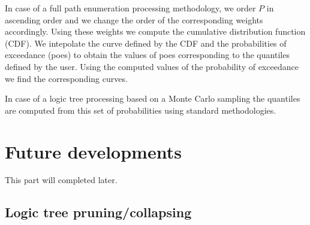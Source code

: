 In case of a full path enumeration processing methodology, we order $P$
in ascending order and we change the order of the corresponding 
weights accordingly. Using these weights we compute the cumulative 
distribution function (CDF). 
%
We intepolate the curve defined by the CDF and the probabilities of 
exceedance (poes) to obtain the values of poes corresponding to the 
quantiles defined by the user. 
%
Using the computed values of the probability of exceedance we find 
the corresponding curves.

In case of a logic tree processing based on a Monte Carlo sampling the 
quantiles are computed from this set of probabilities using standard
methodologies.
%
\clearpage
\section{Future developments}
This part will completed later.
%
\subsection{Logic tree pruning/collapsing}
